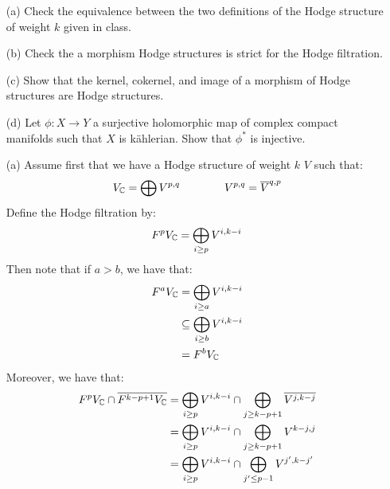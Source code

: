 \documentclass[12pt]{article}
\begin{document}


\begin{problem}{1}
    \bbni
    \begin{enumerate}
        \item[(a)] Check the equivalence between the two definitions of the Hodge structure of weight $k$ given in class. 
        \item[(b)] Check the a morphism Hodge structures is strict for the Hodge filtration. 
        \item[(c)] Show that the kernel, cokernel, and image of a morphism of Hodge structures are Hodge structures.
        \item[(d)] Let $\phi: X \to Y$ a surjective holomorphic map of complex compact manifolds such that $X$ is k\"ahlerian. Show that $\phi^*$ is injective.
    \end{enumerate}
\end{problem}
\begin{solution}
    \begin{enumerate}
        \item[(a)] Assume first that we have a Hodge structure of weight $k$ $V$ such that: 
        \[ V_\mathbb C  = \bigoplus V^{p,q} \qquad \qquad V^{p, q} = \overline{V}^{q, p}\]
        Define the Hodge filtration by: 
        \[ F^p V_\mathbb C = \bigoplus_{i \geq p} V^{i, k-i}\]
        Then note that if $a > b$, we have that:
        \begin{align*}
            F^aV_\mathbb C  &= \bigoplus_{i \geq a} V^{i, k-i} \\
            &\subseteq \bigoplus_{i \geq b} V^{i, k-i} \\
            &= F^bV_\mathbb C
        \end{align*} 
        Moreover, we have that: 
        \begin{align*}
            F^pV_\mathbb C \cap \overline{F^{k-p+1}V_\mathbb C} &= \bigoplus_{i \geq p} V^{i, k-i} \cap \bigoplus_{j \geq k-p+1} \overline{V^{j, k-j}} \\
            &=  \bigoplus_{i \geq p} V^{i, k-i} \cap \bigoplus_{j \geq k-p+1} V^{k-j, j} \\
            &=  \bigoplus_{i \geq p} V^{i, k-i} \cap \bigoplus_{j' \leq p-1} V^{j', k-j'} \\
        \end{align*}
        
        


    \end{enumerate}
\end{solution}
\end{document}
